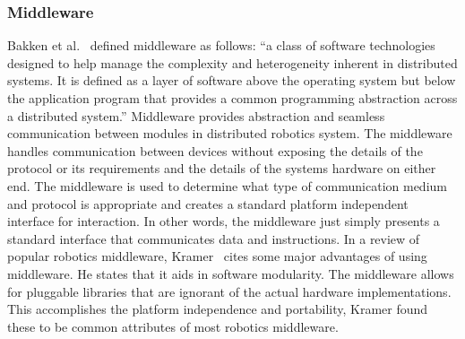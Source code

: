 \subsubsection{Middleware} %
	\label{ssub:middleware}
	Bakken et al.~\parencite{bakken2001middleware} defined middleware as follows: ``a class of software technologies designed to help manage the complexity and heterogeneity inherent in distributed systems. It is defined as a layer of software above the operating system but below the application program that provides a common programming abstraction across a distributed system.'' Middleware provides abstraction and seamless communication between modules in distributed robotics system. The middleware handles communication between devices without exposing the details of the protocol or its requirements and the details of the systems hardware on either end. The middleware is used to determine what type of communication medium and protocol is appropriate and creates a standard platform independent interface for interaction. In other words, the middleware just simply presents a standard interface that communicates data and instructions.
	In a review of popular robotics middleware, Kramer~\parencite{kramer} cites some major advantages of using middleware. He states that it aids in software modularity. The middleware allows for pluggable libraries that are ignorant of the actual hardware implementations. This accomplishes the platform independence and portability, Kramer found these to be common attributes of most robotics middleware.
	




\label{sub:economics}
